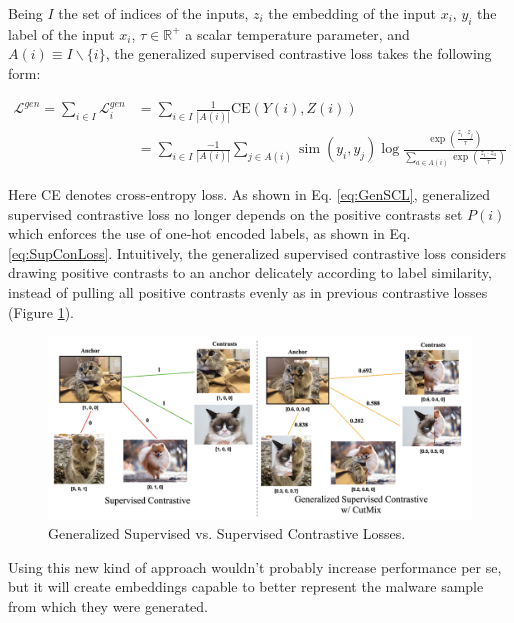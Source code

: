 \noindent Being $I$ the set of indices of the inputs, $z_{i}$ the embedding of the input $x_{i}$, $y_{i}$ the label of the input $x_{i}$, $\tau\in\mathbb{R}^{+}$ a scalar temperature parameter, and $A(i)\equiv I\backslash\{i\}$, the generalized supervised contrastive loss takes the following form:

\begin{equation}\label{eq:GenSCL}
    \begin{aligned} \mathcal{L}^{gen}=\sum_{i \in I} \mathcal{L}_{i}^{gen}
    & =\sum_{i \in I} \frac{1}{|A(i)|} \text{CE}(Y(i), Z(i)) \\ 
    & =\sum_{i \in I} \frac{-1}{|A(i)|} \sum_{j \in A(i)} \operatorname{sim}\left(y_{i}, y_{j}\right) \log \frac{\exp \left(\frac{z_{i} \cdot z_{j}}{\tau}\right)}{\sum_{a\in A(i)} \exp \left(\frac{z_{i} \cdot z_{a}}{\tau}\right)}
    \end{aligned}
\end{equation}

\noindent Here CE denotes cross-entropy loss. As shown in Eq. \ref{eq:GenSCL}, generalized supervised contrastive loss no longer depends on the positive contrasts set $P(i)$ which enforces the use of one-hot encoded labels, as shown in Eq. \ref{eq:SupConLoss}. Intuitively, the generalized supervised contrastive loss considers drawing positive contrasts to an anchor delicately according to label similarity, instead of pulling all positive contrasts evenly as in previous contrastive losses (Figure \ref{fig:SupConVSGenSCL}). \\

\begin{figure}[H]
    \centering
    \includegraphics[width=0.9\linewidth]{Images/SupConVSGenSCL.png}
    \caption{Generalized Supervised vs. Supervised Contrastive Losses.}
    \label{fig:SupConVSGenSCL}
\end{figure}

\noindent Using this new kind of approach wouldn't probably increase performance per se, but it will create embeddings capable to better represent the malware sample from which they were generated.

